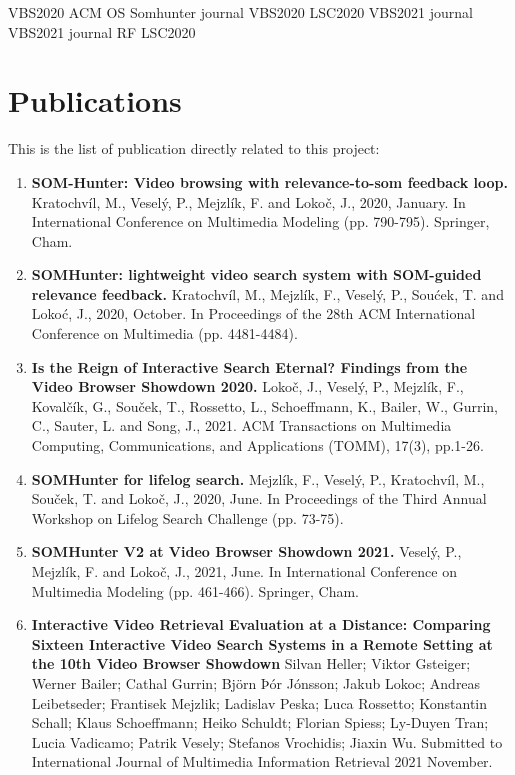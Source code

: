 VBS2020\cite{kratochvil2020som}
ACM OS Somhunter \cite{kratochvil2020somhunter}
journal VBS2020\cite{lokovc2021reign}
LSC2020\cite{mejzlik2020somhunter}
VBS2021\cite{vesely2021somhunter}
journal VBS2021\cite{journalvbs2021}
journal RF \cite{journalRF}
LSC2020\cite{lokovc2021enhanced}


\section{Publications}
This is the list of publication directly related to this project:
\begin{enumerate}
	\item \textbf{SOM-Hunter: Video browsing with relevance-to-som feedback loop.} Kratochvíl, M., Veselý, P., Mejzlík, F. and Lokoč, J., 2020, January. In International Conference on Multimedia Modeling (pp. 790-795). Springer, Cham.
	\item \textbf{SOMHunter: lightweight video search system with SOM-guided relevance feedback.} Kratochvíl, M., Mejzlík, F., Veselý, P., Soućek, T. and Lokoć, J., 2020, October. In Proceedings of the 28th ACM International Conference on Multimedia (pp. 4481-4484).
	\item \textbf{Is the Reign of Interactive Search Eternal? Findings from the Video Browser Showdown 2020.} Lokoč, J., Veselý, P., Mejzlík, F., Kovalčík, G., Souček, T., Rossetto, L., Schoeffmann, K., Bailer, W., Gurrin, C., Sauter, L. and Song, J., 2021.  ACM Transactions on Multimedia Computing, Communications, and Applications (TOMM), 17(3), pp.1-26.
	\item \textbf{SOMHunter for lifelog search.} Mejzlík, F., Veselý, P., Kratochvíl, M., Souček, T. and Lokoč, J., 2020, June. In Proceedings of the Third Annual Workshop on Lifelog Search Challenge (pp. 73-75).
	\item \textbf{SOMHunter V2 at Video Browser Showdown 2021.} Veselý, P., Mejzlík, F. and Lokoč, J., 2021, June. In International Conference on Multimedia Modeling (pp. 461-466). Springer, Cham.
	\item \textbf{Interactive Video Retrieval Evaluation at a Distance: Comparing Sixteen Interactive Video Search Systems in a Remote Setting at the 10th Video Browser Showdown} Silvan Heller; Viktor Gsteiger; Werner Bailer; Cathal Gurrin; Björn Þór Jónsson; Jakub Lokoc; Andreas Leibetseder; Frantisek Mejzlik; Ladislav Peska; Luca Rossetto; Konstantin Schall; Klaus Schoeffmann; Heiko Schuldt; Florian Spiess; Ly-Duyen Tran; Lucia Vadicamo; Patrik Vesely; Stefanos Vrochidis; Jiaxin Wu. Submitted to International Journal of Multimedia Information Retrieval 2021 November.

\end{enumerate}
